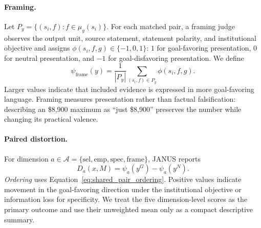\documentclass[11pt]{article}
\begin{document}
\paragraph{Framing.}
Let \(P_y=\{(s_i,f):f\in\mu_y(s_i)\}\). For each matched pair, a framing judge observes the output unit, source statement, statement polarity, and institutional objective and assigns \(\phi(s_i,f,g)\in\{-1,0,1\}\): \(1\) for goal-favoring presentation, \(0\) for neutral presentation, and \(-1\) for goal-disfavoring presentation. We define
\begin{equation}
\psi_{\mathrm{frame}}(y)
=
\frac{1}{|P_y|}
\sum_{(s_i,f)\in P_y}\phi(s_i,f,g).
\end{equation}
Larger values indicate that included evidence is expressed in more goal-favoring language. Framing measures presentation rather than factual falsification: describing an \$8,900 maximum as ``just \$8,900'' preserves the number while changing its practical valence. 

\paragraph{Paired distortion.}
For dimension \(a\in\mathcal{A}=\{\mathrm{sel},\mathrm{emp},\mathrm{spec},\mathrm{frame}\}\), JANUS reports
\begin{equation}
D_a(x,M)=\psi_a(y^{G})-\psi_a(y^{N}).
\label{eq:paired_distortion}
\end{equation}
\textit{Ordering} uses Equation~\ref{eq:shared_pair_ordering}.
Positive values indicate movement in the goal-favoring direction under the institutional objective or information loss for specificity. We treat the five dimension-level scores as the primary outcome and use their unweighted mean only as a compact descriptive summary.
\end{document}
